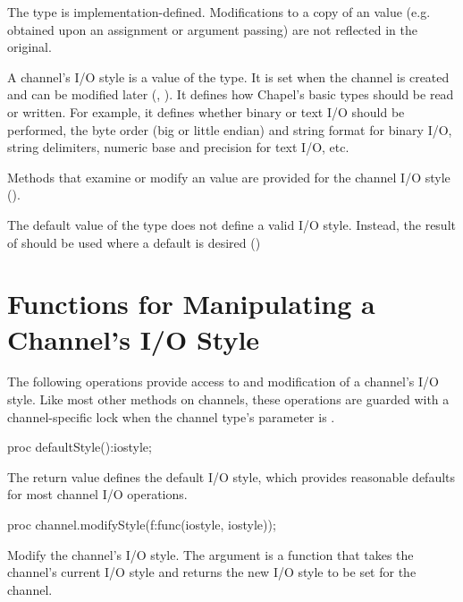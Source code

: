 The  type is implementation-defined.
Modifications to a copy of an  value (e.g.
obtained upon an assignment or argument passing)
are not reflected in the original.

A channel's I/O style is a value of the  type.
It is set when the channel is created and can be modified later
(, ).
It defines how Chapel's basic types should be read or written.
For example, it defines whether binary or text I/O
should be performed, the byte order (big or little endian)
and string format for binary I/O, string delimiters,
numeric base and precision for text I/O, etc.

Methods that examine or modify an  value
are provided for the channel I/O style
().

The default value of the  type does not define
a valid I/O style.
Instead, the result of  should be used where
a default is desired ()



\section{Functions for Manipulating a Channel's I/O Style}
\label{IO_channel_style_mods}

The following operations provide access to and modification of
a channel's I/O style. Like most other methods on channels,
these operations are guarded with a channel-specific lock
when the channel type's  parameter is .

\begin{protohead}
proc defaultStyle():iostyle;
\end{protohead}
\begin{protobody}
The return value defines the default I/O style,
which provides reasonable defaults for most channel I/O operations.
\end{protobody}

\begin{protohead}
proc channel.modifyStyle(f:func(iostyle, iostyle));
\end{protohead}
\begin{protobody}
Modify the channel's I/O style. The argument is
a function that takes the channel's current I/O style and returns
the new I/O style to be set for the channel.
\end{protobody}

